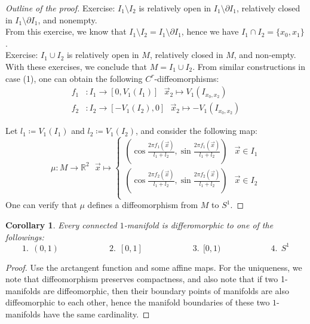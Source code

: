 \documentclass[11pt,oneside]{book}
\theoremstyle{break}
\theoremstyle{break}
\newtheorem{corT}[lem]{Corollary}
\newcommand{\R}{\mathbb{R}}
\newcommand{\exercise}{\color{green}Exercise: \color{black}}
\begin{document}
\begin{proof}[Outline of the proof]
\exercise $I_1 \setminus I_2$ is relatively open in $I_1 \setminus \partial I_1$, relatively closed in $I_1 \setminus \partial I_1$, and nonempty.\\

From this exercise, we know that $I_1 \setminus I_2 = I_1 \setminus \partial I_1$, hence we have $I_1 \cap I_2 = \{x_0,x_1\}$. \\

\exercise $I_1 \cup I_2$ is relatively open in $M$, relatively closed in $M$, and non-empty.\\

With these exercises, we conclude that $M = I_1\cup I_2$. From similar constructions in case (1), one can obtain the following $C^r$-diffeomorphisms:
\begin{align*}
f_1&:I_1 \to [0, V_1(I_1)] \ \ \ \vec{x}_2\mapsto V_1(I_{x_0,x_2})\\
f_2&:I_2 \to [-V_1(I_2),0] \ \ \ \vec{x}_2\mapsto -V_1(I_{x_0,x_2})
\end{align*}


Let $l_1\coloneqq  V_1(I_1) $ and $l_2 \coloneqq V_1(I_2)$, and consider the following map:
$$\mu:M \to \R^2 \ \ \ \vec{x} \mapsto \begin{cases}\left(\cos\frac{2\pi f_1(\vec{x})}{l_1+l_2}, \sin\frac{2\pi f_1(\vec{x})}{l_1+l_2}\right) & \vec{x}\in I_1\\
\left(\cos\frac{2\pi f_2(\vec{x})}{l_1+l_2}, \sin\frac{2\pi f_2(\vec{x})}{l_1+l_2}\right) & \vec{x}\in I_2\\
\end{cases}$$
One can verify that $\mu$ defines a diffeomorphism from $M$ to $S^1$.
\end{proof}


\begin{corT}
Every connected $1$-manifold is differomorphic to one of the followings:
$$1.\ \ (0,1) \qquad\qquad\qquad
2.\   \ [0,1] \qquad\qquad\qquad
3.\   \ [0,1)\qquad\qquad\qquad
4.\   \ S^1$$
\end{corT}
\begin{proof}
Use the arctangent function and some affine maps. For the uniqueness, we note that diffeomorphism preserves compactness, and also note that if two 1-manifolds are diffeomorphic, then their boundary points of manifolds are also diffeomorphic to each other, hence the manifold boundaries of these two $1$-manifolds have the same cardinality. 
\end{proof}
\end{document}
